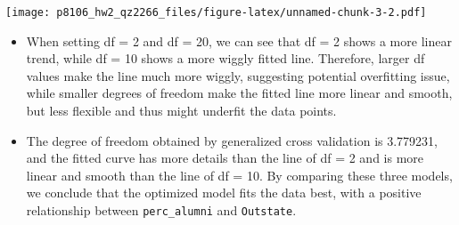 \documentclass[
]{article}
\newenvironment{Shaded}{\begin{snugshade}}{\end{snugshade}}
\newcommand{\AttributeTok}[1]{\textcolor[rgb]{0.77,0.63,0.00}{#1}}
\newcommand{\DecValTok}[1]{\textcolor[rgb]{0.00,0.00,0.81}{#1}}
\newcommand{\FunctionTok}[1]{\textcolor[rgb]{0.00,0.00,0.00}{#1}}
\newcommand{\NormalTok}[1]{#1}
\newcommand{\OtherTok}[1]{\textcolor[rgb]{0.56,0.35,0.01}{#1}}
\newcommand{\SpecialCharTok}[1]{\textcolor[rgb]{0.00,0.00,0.00}{#1}}
\begin{document}
\begin{Shaded}
\end{Shaded}

\texttt{[image: p8106\_hw2\_qz2266\_files/figure-latex/unnamed-chunk-3-2.pdf]}

\begin{itemize}
\item
  When setting df = 2 and df = 20, we can see that df = 2 shows a more
  linear trend, while df = 10 shows a more wiggly fitted line.
  Therefore, larger df values make the line much more wiggly, suggesting
  potential overfitting issue, while smaller degrees of freedom make the
  fitted line more linear and smooth, but less flexible and thus might
  underfit the data points.
\item
  The degree of freedom obtained by generalized cross validation is
  3.779231, and the fitted curve has more details than the line of df =
  2 and is more linear and smooth than the line of df = 10. By comparing
  these three models, we conclude that the optimized model fits the data
  best, with a positive relationship between \texttt{perc\_alumni} and
  \texttt{Outstate}.
\end{itemize}
\end{document}
